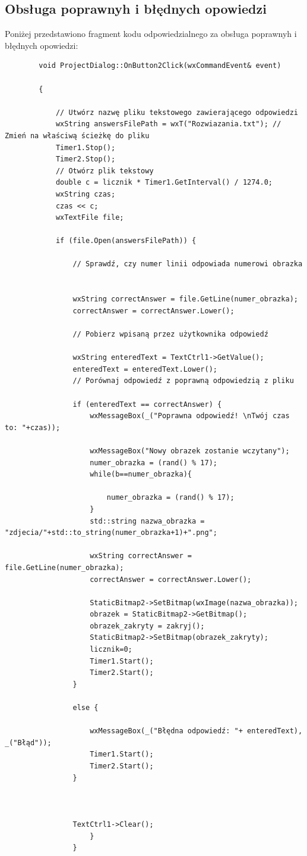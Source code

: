 \documentclass{article}
\begin{document}
	\subsection{Obsługa poprawnyh i błędnych opowiedzi}
	Poniżej przedstawiono fragment kodu odpowiedzialnego za obsługa poprawnyh i błędnych opowiedzi:
	\begin{lstlisting}
		void ProjectDialog::OnButton2Click(wxCommandEvent& event)
		
		{
			
			// Utwórz nazwę pliku tekstowego zawierającego odpowiedzi
			wxString answersFilePath = wxT("Rozwiazania.txt"); // Zmień na właściwą ścieżkę do pliku
			Timer1.Stop();
			Timer2.Stop();
			// Otwórz plik tekstowy
			double c = licznik * Timer1.GetInterval() / 1274.0;
			wxString czas;
			czas << c;
			wxTextFile file;
			
			if (file.Open(answersFilePath)) {
				
				// Sprawdź, czy numer linii odpowiada numerowi obrazka
				
				
				wxString correctAnswer = file.GetLine(numer_obrazka);
				correctAnswer = correctAnswer.Lower();
				
				// Pobierz wpisaną przez użytkownika odpowiedź
				
				wxString enteredText = TextCtrl1->GetValue();
				enteredText = enteredText.Lower();
				// Porównaj odpowiedź z poprawną odpowiedzią z pliku
				
				if (enteredText == correctAnswer) {
					wxMessageBox(_("Poprawna odpowiedź! \nTwój czas to: "+czas));
					
					wxMessageBox("Nowy obrazek zostanie wczytany");
					numer_obrazka = (rand() % 17);
					while(b==numer_obrazka){
						
						numer_obrazka = (rand() % 17);
					}
					std::string nazwa_obrazka = "zdjecia/"+std::to_string(numer_obrazka+1)+".png";
					
					wxString correctAnswer = file.GetLine(numer_obrazka);
					correctAnswer = correctAnswer.Lower();
					
					StaticBitmap2->SetBitmap(wxImage(nazwa_obrazka));
					obrazek = StaticBitmap2->GetBitmap();
					obrazek_zakryty = zakryj();
					StaticBitmap2->SetBitmap(obrazek_zakryty);
					licznik=0;
					Timer1.Start();
					Timer2.Start();
				}
				
				else {
					
					wxMessageBox(_("Błędna odpowiedź: "+ enteredText), _("Błąd"));
					Timer1.Start();
					Timer2.Start();
				}
				
				
				
				TextCtrl1->Clear();
					}
				}
		
	\end{lstlisting}
	
\end{document}
